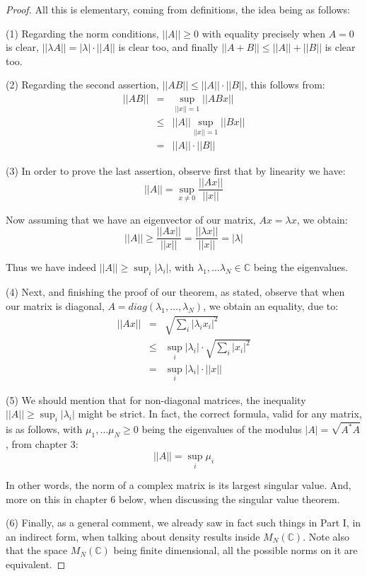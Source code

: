 \documentclass[12pt]{amsbook}
\begin{document}
\begin{proof}
All this is elementary, coming from definitions, the idea being as follows:

\medskip

(1) Regarding the norm conditions, $||A||\geq0$ with equality precisely when $A=0$ is clear, $||\lambda A||=|\lambda|\cdot||A||$ is clear too, and finally $||A+B||\leq||A||+||B||$ is clear too.

\medskip

(2) Regarding the second assertion, $||AB||\leq||A||\cdot||B||$, this follows from:
\begin{eqnarray*}
||AB||
&=&\sup_{||x||=1}||ABx||\\
&\leq&||A||\sup_{||x||=1}||Bx||\\
&=&||A||\cdot||B||
\end{eqnarray*}

(3) In order to prove the last assertion, observe first that by linearity we have:
$$||A||=\sup_{x\neq0}\frac{||Ax||}{||x||}$$

Now assuming that we have an eigenvector of our matrix, $Ax=\lambda x$, we obtain:
$$||A||\geq\frac{||Ax||}{||x||}=\frac{||\lambda x||}{||x||}=|\lambda|$$

Thus we have indeed $||A||\geq\sup_i|\lambda_i|$, with $\lambda_1,\ldots\lambda_N\in\mathbb C$ being the eigenvalues. 

\medskip

(4) Next, and finishing the proof of our theorem, as stated, observe that when our matrix is diagonal, $A=diag(\lambda_1,\ldots,\lambda_N)$, we obtain an equality, due to:
\begin{eqnarray*}
||Ax||
&=&\sqrt{\sum_i|\lambda_ix_i|^2}\\
&\leq&\sup_i|\lambda_i|\cdot\sqrt{\sum_i|x_i|^2}\\
&=&\sup_i|\lambda_i|\cdot||x||
\end{eqnarray*}

(5) We should mention that for non-diagonal matrices, the inequality $||A||\geq\sup_i|\lambda_i|$ might be strict. In fact, the correct formula, valid for any matrix, is as follows, with $\mu_1,\ldots\mu_N\geq0$ being the eigenvalues of the modulus $|A|=\sqrt{A^*A}$, from chapter 3:
$$||A||=\sup_i\mu_i$$

In other words, the norm of a complex matrix is its largest singular value. And, more on this in chapter 6 below, when discussing the singular value theorem.

\medskip

(6) Finally, as a general comment, we already saw in fact such things in Part I, in an indirect form, when talking about density results inside $M_N(\mathbb C)$. Note also that the space $M_N(\mathbb C)$ being finite dimensional, all the possible norms on it are equivalent.
\end{proof}
\end{document}
